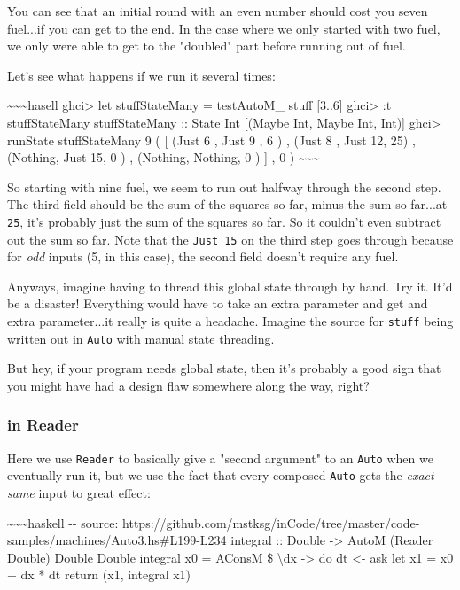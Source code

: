 \documentclass[]{article}
\begin{document}
You can see that an initial round with an even number should cost you seven
fuel...if you can get to the end. In the case where we only started with two
fuel, we only were able to get to the "doubled" part before running out of fuel.

Let's see what happens if we run it several times:

\textasciitilde{}\textasciitilde{}\textasciitilde{}hasell ghci\textgreater{} let
stuffStateMany = testAutoM\_ stuff {[}3..6{]} ghci\textgreater{} :t
stuffStateMany stuffStateMany :: State Int {[}(Maybe Int, Maybe Int, Int){]}
ghci\textgreater{} runState stuffStateMany 9 ( {[} (Just 6 , Just 9 , 6 ) ,
(Just 8 , Just 12, 25) , (Nothing, Just 15, 0 ) , (Nothing, Nothing, 0 ) {]} , 0
) \textasciitilde{}\textasciitilde{}\textasciitilde{}

So starting with nine fuel, we seem to run out halfway through the second step.
The third field should be the sum of the squares so far, minus the sum so
far...at \texttt{25}, it's probably just the sum of the squares so far. So it
couldn't even subtract out the sum so far. Note that the \texttt{Just\ 15} on
the third step goes through because for \emph{odd} inputs (5, in this case), the
second field doesn't require any fuel.

Anyways, imagine having to thread this global state through by hand. Try it.
It'd be a disaster! Everything would have to take an extra parameter and get and
extra parameter...it really is quite a headache. Imagine the source for
\texttt{stuff} being written out in \texttt{Auto} with manual state threading.

But hey, if your program needs global state, then it's probably a good sign that
you might have had a design flaw somewhere along the way, right?

\subsubsection{in Reader}

Here we use \texttt{Reader} to basically give a "second argument" to an
\texttt{Auto} when we eventually run it, but we use the fact that every composed
\texttt{Auto} gets the \emph{exact same} input to great effect:

\textasciitilde{}\textasciitilde{}\textasciitilde{}haskell -\/- source:
https://github.com/mstksg/inCode/tree/master/code-samples/machines/Auto3.hs\#L199-L234
integral :: Double -\textgreater{} AutoM (Reader Double) Double Double integral
x0 = AConsM \$ \textbackslash{}dx -\textgreater{} do dt \textless{}- ask let x1
= x0 + dx * dt return (x1, integral x1)
\end{document}

